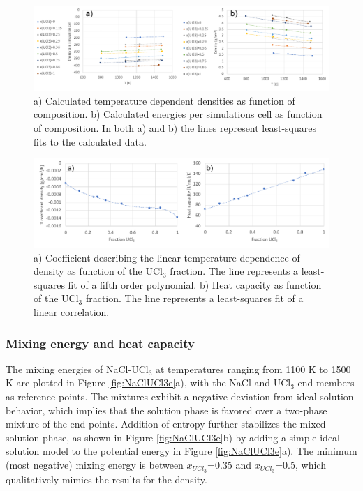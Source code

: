 \documentclass[titlepage=firstiscover,11pt,fleqn,headheight=14pt,footheight=40.8pt]{scrreprt}
\begin{document}
\begin{figure}[htb]
\centering
\includegraphics[width=1.00\textwidth]{FIG6c.pdf}
\caption{a) Calculated temperature dependent densities as function of composition. b) Calculated energies per simulations cell as function of composition. In both a) and b) the lines represent least-squares fits to the calculated data.}  
\label{fig:NaClUCl3_t}
\end{figure}

\begin{figure}[htb]
\centering
\includegraphics[width=1.00\textwidth]{FIG6f.pdf}
\caption{a) Coefficient describing the linear temperature dependence of density as function of the UCl$_3$ fraction. The line represents a least-squares fit of a fifth order polynomial. b) Heat capacity as function of the UCl$_3$ fraction. The line represents a least-squares fit of a linear correlation.}
\label{fig:NaClUCl3_comp}
\end{figure}

\subsubsection{Mixing energy and heat capacity}
The mixing energies of NaCl-UCl$_3$ at temperatures ranging from 1100 K to 1500 K are plotted in Figure \ref{fig:NaClUCl3e}a), with the NaCl and UCl$_3$ end members as reference points. The mixtures exhibit a negative deviation from ideal solution behavior, which implies that the solution phase is favored over a two-phase mixture of the end-points. Addition of entropy further stabilizes the mixed solution phase, as shown in Figure \ref{fig:NaClUCl3e}b) by adding a simple ideal solution model to the potential energy in Figure \ref{fig:NaClUCl3e}a).
 The minimum (most negative) mixing energy is between $x_{UCl_3}$=0.35 and  $x_{UCl_3}$=0.5, which qualitatively mimics the results for the density. %
 
\end{document}
